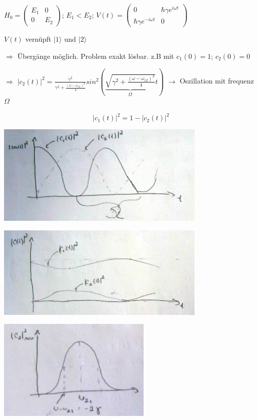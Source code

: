 \(H_0 =\begin{pmatrix} E_1& 0\\0&E_2\end{pmatrix}\); \(E_1<E_2\); \(V(t) =\begin{pmatrix}0&\hbar \gamma e^{i\omega t}\\\hbar \gamma e^{-i\omega t}&0 \end{pmatrix}\)


\(V(t)\) vernüpft \(|1\rangle\) und \(|2\rangle\)


\(\Rightarrow\) Übergänge möglich. Problem exakt lösbar. z.B mit \(c_1(0)=1\); \(c_2(0)=0\)


\(\Rightarrow\) \(|c_2(t)|^2=\frac{\gamma^2}{\gamma^2+\frac{(\omega-\omega_{12})^2}{4}}sin^2\left( \underbrace{\sqrt{\gamma^2+\frac{(\omega-\omega_{12})^2}{4}}}_{\Omega}t\right)\) \(\rightarrow\) Oszillation mit frequenz \(\Omega\)

 \[|c_1(t)|^2 = 1-|c_2(t)|^2\]



\includegraphics[width=0.75\textwidth]{kap03_04.png}


\includegraphics[width=0.75\textwidth]{kap03_05.png}


\includegraphics[width=0.55\textwidth]{kap03_06.png}


